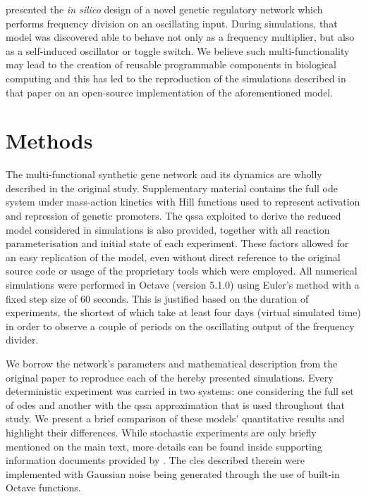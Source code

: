   \citet{originals} presented the \textit{in silico} design of a novel genetic regulatory network which performs frequency division on an oscillating input.
  During simulations, that model was discovered able to behave not only as a frequency multiplier, but also as a self-induced oscillator or toggle switch.
  We believe such multi-functionality may lead to the creation of reusable programmable components in biological computing and this has led to the reproduction of the simulations described in that paper on an open-source implementation of the aforementioned model.


\section{Methods}

  The multi-functional synthetic gene network and its dynamics are wholly described in the original study.
  Supplementary material contains the full \ac{ode} system under mass-action kinetics with Hill functions used to represent activation and repression of genetic promoters.
  The \ac{qssa} exploited to derive the reduced model considered in simulations is also provided, together with all reaction parameterisation and initial state of each experiment.
  These factors allowed for an easy replication of the model, even without direct reference to the original source code or usage of the proprietary tools which were employed.
  All numerical simulations were performed in Octave (version 5.1.0) using Euler's method with a fixed step size of 60 seconds.
  This is justified based on the duration of experiments, the shortest of which take at least four days (virtual simulated time) in order to observe a couple of periods on the oscillating output of the frequency divider.

  We borrow the network's parameters and mathematical description from the original paper to reproduce each of the hereby presented simulations.
  Every deterministic experiment was carried in two systems: one considering the full set of \ac{ode}s and another with the \ac{qssa} approximation that is used throughout that study.
  We present a brief comparison of these models' quantitative results and highlight their differences.
  While stochastic experiments are only briefly mentioned on the main text, more details can be found inside supporting information documents provided by \citet{originals}.
  The \ac{cles} described therein were implemented with Gaussian noise being generated through the use of built-in Octave functions.

